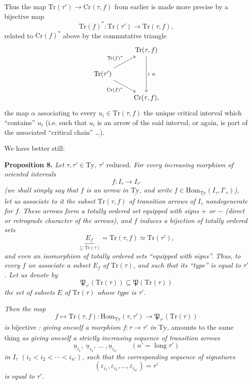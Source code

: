 \documentclass[11pt]{article}
\newcommand{\printedpage}[1]{\marginpar{\footnotesize p.~#1}}
\newcommand{\msp}[1]{\marginpar{\footnotesize [#1]}}
\newcommand{\Tr}{\mathrm{Tr}}
\newcommand{\Cr}{\mathrm{Cr}}
\newcommand{\Hom}{\mathrm{Hom}}
\newcommand{\lng}{\operatorname{long}}
\newcommand{\uTy}{\underline{\mathrm{Ty}}}
\begin{document}
Thus the map $\Tr(\tau') \longrightarrow \Cr(\tau, f)$ from earlier is made more precise by a bijective map
\[
\Tr(f)^* : \Tr(\tau') \longrightarrow \Tr(\tau, f),
\]
related to $\Cr(f)^*$ above by the commutative triangle
\[
\begin{tikzcd}
 & \Tr(\tau, f) \arrow[dd, "\wr\ \alpha"] \\
\Tr(\tau') \arrow[ur, "\Tr(f)^*"] \arrow[dr, "\Cr(f)^*"'] & \\
 & \Cr(\tau, f),
\end{tikzcd}
\]
\printedpage{25}
\msp{page 39}
the map $\alpha$ associating to every $u_i \in \Tr(\tau, f)$ the unique critical interval which ``contains'' $u_i$ (i.e. such that $u_i$ is an arrow of the said interval, or again, is part of the associated ``critical chain'' \dots).

We have better still:

\textbf{Proposition 8.} \textit{Let $\tau, \tau' \in \mathrm{Ty}$, $\tau'$} reduced. \textit{For every increasing morphism of oriented intervals}
\[
f : I_\tau \longrightarrow I_{\tau'}
\]
\textit{(we shall simply say that $f$ is an arrow in $\uTy$, and write $f \in \Hom_{\uTy}(I_\tau, I'_\tau)$), let us associate to it the subset $\Tr(\tau, f)$ of transition arrows of $I_\tau$ nondegenerate for $f$. These arrows form a totally ordered set equipped with signs $+$ or $-$ (direct or retrograde character of the arrows), and $f$ induces a bijection of totally ordered sets} %
\[
\underbrace{E_f}_{\subseteq \Tr(\tau)} = \Tr(\tau, f) \simeq \Tr(\tau'),
\]
\textit{and even an isomorphism of totally ordered sets ``equipped with signs''. Thus, to every $f$ we associate a subset $E_f$ of $\Tr(\tau)$, and such that its ``type'' is equal to $\tau'$. Let us denote by}
\[
\mathfrak{P}_{\tau'}(\Tr(\tau)) \subseteq \mathfrak{P}(\Tr(\tau))
\]
\textit{the set of subsets $E$ of $\Tr(\tau)$ whose type is $\tau'$.}

\msp{page 40}
\textit{Then the map}
\[
f \longmapsto \Tr(\tau, f) : \Hom_{\uTy}(\tau, \tau') \longrightarrow \mathfrak{P}_{\tau'}(\Tr(\tau))
\]
\textit{is} bijective \textit{: giving oneself a morphism $f : \tau \longrightarrow \tau'$ in $\uTy$,} amounts to the same thing \textit{as giving oneself a strictly increasing sequence of transition arrows}
\[
\underline{u}_{i_1},\ \underline{u}_{i_2},\ \dots\ ,\underline{u}_{i_{n'}} \qquad (n' = \lng \tau')
\]
\textit{in $I_\tau$ $(i_1 < i_2 < \cdots < i_{n'})$, such that the corresponding sequence of signatures}
\[
(\varepsilon_{i_1}, \varepsilon_{i_2}, \dots, \varepsilon_{i_{n'}}) = \tau'
\]
\textit{is equal to $\tau'$.}
\end{document}
